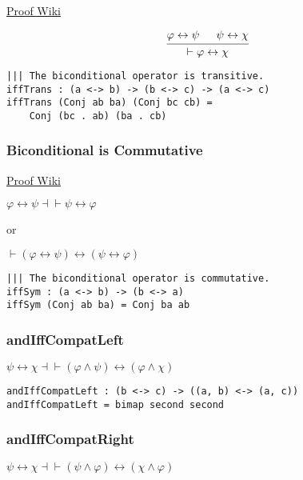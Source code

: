 \documentclass{acm_proc_article-sp}
\renewcommand{\iff}{\leftrightarrow}
\begin{document}
\href{https://proofwiki.org/wiki/Biconditional_is_Transitive}{Proof
Wiki}

\[
  \begin{prooftree}
    \Hypo{ \varphi \iff \psi }
    \Hypo{ \psi \iff \chi }
    \Infer2 { \vdash \varphi \iff \chi }
  \end{prooftree}
\]

\begin{verbatim}
||| The biconditional operator is transitive.
iffTrans : (a <-> b) -> (b <-> c) -> (a <-> c)
iffTrans (Conj ab ba) (Conj bc cb) =
    Conj (bc . ab) (ba . cb)
\end{verbatim}

\subsubsection{Biconditional is
Commutative}\label{biconditional-is-commutative}

\href{https://proofwiki.org/wiki/Biconditional_is_Commutative}{Proof
Wiki}

\(\varphi \iff \psi \dashv\vdash \psi \iff \varphi\)

or

\(\vdash (\varphi \iff \psi) \iff (\psi \iff \varphi)\)

\begin{verbatim}
||| The biconditional operator is commutative.
iffSym : (a <-> b) -> (b <-> a)
iffSym (Conj ab ba) = Conj ba ab
\end{verbatim}

\subsubsection{andIffCompatLeft}\label{andiffcompatleft}

\(\psi \iff \chi \dashv\vdash (\varphi \land \psi) \iff (\varphi \land \chi)\)

\begin{verbatim}
andIffCompatLeft : (b <-> c) -> ((a, b) <-> (a, c))
andIffCompatLeft = bimap second second
\end{verbatim}

\subsubsection{andIffCompatRight}\label{andiffcompatright}

\(\psi \iff \chi \dashv\vdash (\psi \land \varphi) \iff (\chi \land \varphi)\)
\end{document}

